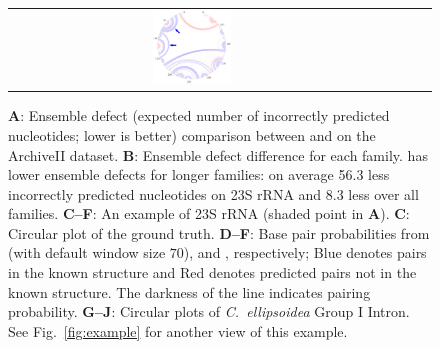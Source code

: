 \begin{figure}[!htb]
\begin{tabular}{ccccc}
\hspace{-0.35cm}\includegraphics[width=0.22\textwidth]{figs/grp1_lpv_example.pdf}
\\[-0.2cm]
\end{tabular}
\caption{{\bf A}: Ensemble defect (expected number of incorrectly predicted nucleotides; lower is better) comparison between \viennarnafold and \linearpartition on the ArchiveII dataset.
  {\bf B}: Ensemble defect difference for each family.
  \linearpartition has lower ensemble defects for longer families:
   on average 56.3 less incorrectly predicted nucleotides on 23S rRNA and 8.3 less over all families.
  {\bf C--F}: An example of \ecoli 23S rRNA (shaded point in {\bf A}). 
  {\bf C}: Circular plot of the ground truth.
{\bf D--F}: Base pair probabilities from \viennarnaplfold (with default window size $70$), \rnafold and \linearpartition, respectively; 
Blue denotes pairs in the known structure and Red denotes predicted pairs not in the known structure.  
  The darkness of the line indicates pairing probability.
  {\bf G--J}: Circular plots of {\it C.~ellipsoidea} Group I Intron. 
See Fig.~\ref{fig:example} 
for another view of this example. %
\label{fig:ensemble}
\vspace{-0.2cm}
}
\end{figure}

